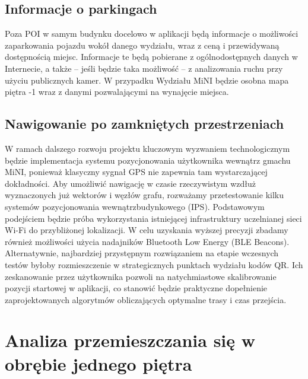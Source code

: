 \documentclass[14pt,a4paper]{extarticle}
\begin{document}
\subsection{Informacje o parkingach}
Poza POI w samym budynku docelowo w aplikacji będą informacje o możliwości zaparkowania pojazdu wokół danego wydziału, wraz z ceną i przewidywaną dostępnością miejsc. Informacje te będą pobierane z ogólnodostępnych danych w Internecie, a także -- jeśli będzie taka możliwość -- z analizowania ruchu przy użyciu publicznych kamer. W przypadku Wydziału MiNI będzie osobna mapa piętra -1 wraz z danymi pozwalającymi na wynajęcie miejsca.

\subsection{Nawigowanie po zamkniętych przestrzeniach}
W ramach dalszego rozwoju projektu kluczowym wyzwaniem technologicznym będzie implementacja systemu pozycjonowania użytkownika wewnątrz gmachu MiNI, ponieważ klasyczny sygnał GPS nie zapewnia tam wystarczającej dokładności. Aby umożliwić nawigację w czasie rzeczywistym wzdłuż wyznaczonych już wektorów i węzłów grafu, rozważamy przetestowanie kilku systemów pozycjonowania wewnątrzbudynkowego (IPS). Podstawowym podejściem będzie próba wykorzystania istniejącej infrastruktury uczelnianej sieci Wi-Fi do przybliżonej lokalizacji. W celu uzyskania wyższej precyzji zbadamy również możliwości użycia nadajników Bluetooth Low Energy (BLE Beacons). Alternatywnie, najbardziej przystępnym rozwiązaniem na etapie wczesnych testów byłoby rozmieszczenie w strategicznych punktach wydziału kodów QR. Ich zeskanowanie przez użytkownika pozwoli na natychmiastowe skalibrowanie pozycji startowej w aplikacji, co stanowić będzie praktyczne dopełnienie zaprojektowanych algorytmów obliczających optymalne trasy i czas przejścia.

\section{Analiza przemieszczania się w obrębie jednego piętra}
\end{document}
